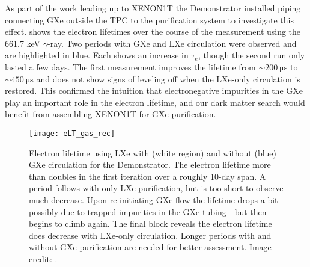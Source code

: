As part of the work leading up to XENON1T the Demonstrator installed piping connecting GXe outside the TPC to the
purification system to investigate this effect.   shows the electron lifetimes over
the course of the measurement using the 661.7 keV  $\gamma$-ray.  Two periods with GXe and LXe circulation were observed and
are highlighted in blue.  Each shows an increase in
$\tau_e$, though the second run only lasted a few days.  The first measurement improves the lifetime from
${\sim} 200\ \mathrm{\mu s}$ to ${\sim} 450\ \mathrm{\mu s}$ and does not show signs of leveling off when the LXe-only circulation is
restored.  This confirmed the intuition that electronegative impurities in the GXe play an important role in the electron
lifetime, and our dark matter search would benefit from assembling XENON1T for GXe purification.

\begin{figure}
\centering
\texttt{[image: eLT\_gas\_rec]}
\caption{Electron lifetime using LXe with (white region) and without (blue) GXe circulation for the Demonstrator.  The electron lifetime
more than doubles in the first iteration over a roughly 10-day span.  A period follows with
only LXe purification, but is too short to observe much decrease.  Upon re-initiating GXe flow the lifetime drops a bit - possibly due to
trapped impurities in the GXe tubing - but then begins to climb again.  The final block reveals the electron lifetime does
decrease with LXe-only circulation.  Longer periods with and without GXe purification are needed for better assessment.  Image credit:
.}
\label{fig:electron_lifetime_model_gxe_demonstrator}
\end{figure}

